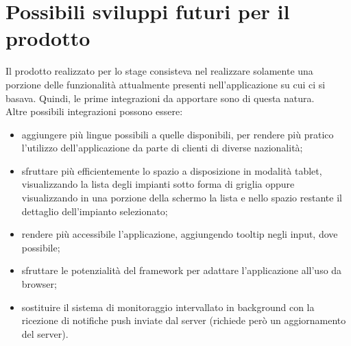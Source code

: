 \section{Possibili sviluppi futuri per il prodotto}
\label{sec:sviluppi-futuri}

Il prodotto realizzato per lo stage consisteva nel realizzare solamente una porzione delle funzionalità attualmente presenti nell'applicazione su cui ci si basava. Quindi, le prime integrazioni da apportare sono di questa natura.\\
Altre possibili integrazioni possono essere:
\begin{itemize}
    \item aggiungere più lingue possibili a quelle disponibili, per rendere più pratico l'utilizzo dell'applicazione da parte di clienti di diverse nazionalità;
    \item sfruttare più efficientemente lo spazio a disposizione in modalità tablet, visualizzando la lista degli impianti sotto forma di griglia oppure visualizzando in una porzione della schermo la lista e nello spazio restante il dettaglio dell'impianto selezionato;
    \item rendere più accessibile l'applicazione, aggiungendo tooltip negli input, dove possibile;
    \item sfruttare le potenzialità del framework per adattare l'applicazione all'uso da browser;
    \item sostituire il sistema di monitoraggio intervallato in background con la ricezione di notifiche push inviate dal server (richiede però un aggiornamento del server).
\end{itemize}
